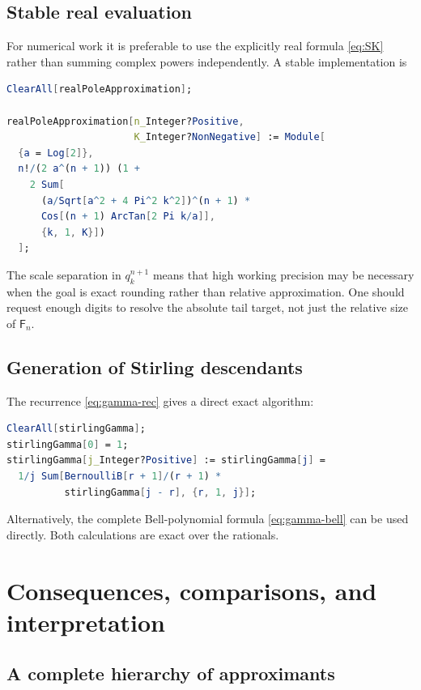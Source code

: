 \documentclass[11pt,a4paper]{article}
\theoremstyle{definition}
\theoremstyle{remark}
\newcommand{\Fub}{\mathsf F}
\begin{document}
\subsection{Stable real evaluation}

For numerical work it is preferable to use the explicitly real formula
\eqref{eq:SK} rather than summing complex powers independently.  A stable
implementation is
\begin{lstlisting}[language=Mathematica]
ClearAll[realPoleApproximation];

realPoleApproximation[n_Integer?Positive,
                      K_Integer?NonNegative] := Module[
  {a = Log[2]},
  n!/(2 a^(n + 1)) (1 +
    2 Sum[
      (a/Sqrt[a^2 + 4 Pi^2 k^2])^(n + 1) *
      Cos[(n + 1) ArcTan[2 Pi k/a]],
      {k, 1, K}])
  ];
\end{lstlisting}
The scale separation in \(q_k^{n+1}\) means that high working precision may be
necessary when the goal is exact rounding rather than relative approximation.
One should request enough digits to resolve the absolute tail target, not just
the relative size of \(\Fub_n\).

\subsection{Generation of Stirling descendants}

The recurrence \eqref{eq:gamma-rec} gives a direct exact algorithm:
\begin{lstlisting}[language=Mathematica]
ClearAll[stirlingGamma];
stirlingGamma[0] = 1;
stirlingGamma[j_Integer?Positive] := stirlingGamma[j] =
  1/j Sum[BernoulliB[r + 1]/(r + 1) *
          stirlingGamma[j - r], {r, 1, j}];
\end{lstlisting}
Alternatively, the complete Bell-polynomial formula
\eqref{eq:gamma-bell} can be used directly.  Both calculations are exact over
the rationals.

\section{Consequences, comparisons, and interpretation}

\subsection{A complete hierarchy of approximants}
\end{document}
